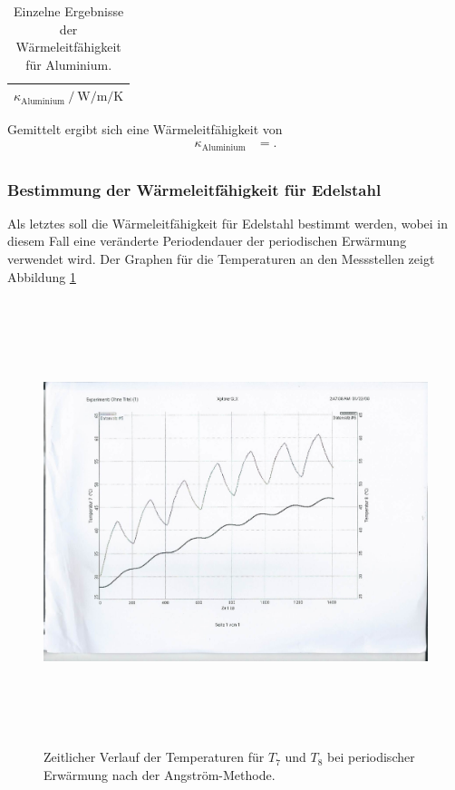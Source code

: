 \begin{table}
  \centering
  \caption{Einzelne Ergebnisse der Wärmeleitfähigkeit für Aluminium.}
  \label{tab:6}
  \begin{tabular}{c}
    \toprule
    {$\kappa_\text{Aluminium} \:/\: \si{\watt\per\metre\per\kelvin}$}\\
    \midrule
    
    \bottomrule
  \end{tabular}
\end{table}
Gemittelt ergibt sich eine Wärmeleitfähigkeit von
\begin{align*}
  \kappa_\text{Aluminium} &= . \\
\end{align*}

\subsubsection{Bestimmung der Wärmeleitfähigkeit für Edelstahl}
Als letztes soll die Wärmeleitfähigkeit für Edelstahl bestimmt werden, wobei in diesem Fall eine veränderte Periodendauer der periodischen Erwärmung verwendet wird.
Der Graphen für die Temperaturen an den Messstellen zeigt Abbildung \ref{fig:7}
\begin{figure}[H]
  \centering
  \includegraphics[height=13cm]{scan-1.jpg}
  \caption{Zeitlicher Verlauf der Temperaturen für $T_7$ und $T_8$ bei periodischer Erwärmung nach der Angström-Methode.}
  \label{fig:7}
\end{figure}
